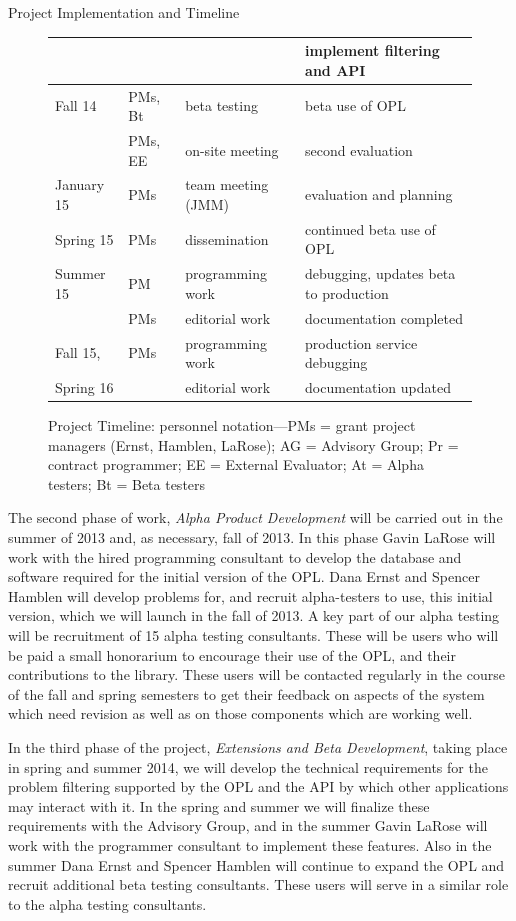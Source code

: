 \documentclass[11pt]{article}
\begin{document}
\begin{section}{Project Implementation and Timeline}
\begin{figure}
\begin{center}
\begin{tabular}{|l|l|l|l|}
	& & & implement filtering and API \\
  \hline
  Fall 14 & PMs, Bt & beta testing & beta use of OPL \\
	& PMs, EE & on-site meeting & second evaluation \\
  \hline
  January 15 & PMs & team meeting (JMM) & evaluation and planning \\
  \hline
  Spring 15 & PMs & dissemination & continued beta use of OPL \\
  \hline
  Summer 15 & PM & programming work & debugging, updates beta to
	production \\ 
	& PMs & editorial work & documentation completed \\
  \hline
  Fall 15, & PMs & programming work & production service debugging\\
  Spring 16 & & editorial work & documentation updated \\ 
  \hline
\end{tabular}
\caption{Project Timeline: personnel notation---PMs = grant project
  managers (Ernst, Hamblen, LaRose); AG =
  Advisory Group; Pr = contract programmer; EE = External Evaluator; At =
  Alpha testers; Bt = Beta testers}
\label{timeline}
\end{center}
\end{figure}

The second phase of work, \emph{Alpha Product Development} will be carried
out in the summer of 2013 and, as necessary, fall of 2013.  In this phase
Gavin LaRose will work with the hired programming consultant to develop
the database and software required for the initial version of the OPL.
Dana Ernst and Spencer Hamblen will develop problems for, and recruit
alpha-testers to use, this initial version, which we will launch in the
fall of 2013.  A key part of our alpha testing will be recruitment of 15
alpha testing consultants.  These will be users who will be paid a small
honorarium to encourage their use of the OPL, and their contributions to
the library.  These users will be contacted regularly in the course of the
fall and spring semesters to get their feedback on aspects of the system
which need revision as well as on those components which are working well.

In the third phase of the project, \emph{Extensions and Beta Development},
taking place in spring and summer 2014, we will develop the technical
requirements for the problem filtering supported by the OPL and the API by
which other applications may interact with it.  In the spring and summer
we will finalize these requirements with the Advisory Group, and in the
summer Gavin LaRose will work with the programmer consultant to implement
these features.  Also in the summer Dana Ernst and Spencer Hamblen will
continue to expand the OPL and recruit additional beta testing
consultants.  These users will serve in a similar role to the alpha
testing consultants.


\end{section}
\end{document}
